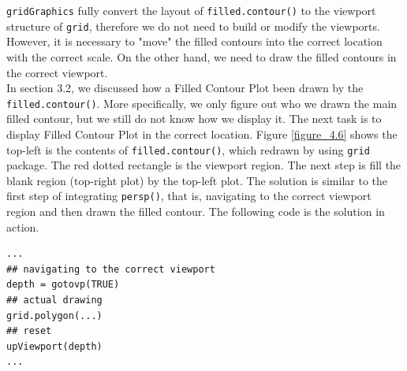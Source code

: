 \documentclass[paper=a4, fontsize=11pt]{report}
\begin{document}
\texttt{gridGraphics} fully convert the layout of \texttt{filled.contour()} to the viewport structure of \texttt{grid}, therefore we do not need to build or modify the viewports. However, it is necessary to "move" the filled contours into the correct location with the correct scale. On the other hand, we need to draw the filled contours in the correct viewport.\\

In section 3.2, we discussed how a Filled Contour Plot been drawn by the \texttt{filled.contour()}. More specifically, we only figure out who we drawn the main filled contour, but we still do not know how we display it. The next task is to display Filled Contour Plot in the correct location. Figure \ref{figure_4.6} shows the top-left is the contents of \texttt{filled.contour()}, which redrawn by using \texttt{grid} package. The red dotted rectangle is the viewport region. The next step is fill the blank region (top-right plot) by the top-left plot. The solution is similar to the first step of integrating \texttt{persp()}, that is, navigating to the correct viewport region and then drawn the filled contour. The following code is the solution in action.

\begin{lstlisting}
...
## navigating to the correct viewport
depth = gotovp(TRUE)
## actual drawing
grid.polygon(...)
## reset
upViewport(depth)
...
\end{lstlisting}
\end{document}
